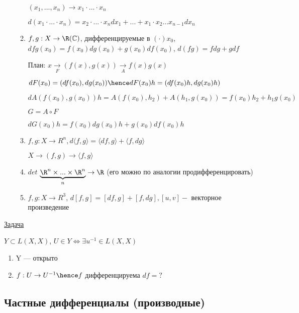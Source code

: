 \begin{examples}
\begin{enumerate}
\begin{enumerate}
        $(x_1, ..., x_n) \to x_1 \cdot \ldots \cdot x_n$

        $d(x_1 \cdot...\cdot x_n) = x_2 \cdot ... \cdot x_n dx_1 + ... + x_1 \cdot x_2 ... x_{n - 1} dx_n$

        \item $f, g : X \to \R (\mathbb{C})$, дифференцируемые в $(\cdot)x_0$, $dfg(x_0) = f(x_0)dg(x_0) + g(x_0) df(x_0)$, $d(fg) = fdg + gdf$
        
        План: $x \underset{F}{\to} (f(x), g(x)) \underset{A}{\to} f(x) g(x)$

        $dF(x_0) = (df(x_0), dg(x_0)) \hence dF(x_0)h = (df(x_0)h, dg(x_0)h)$

        $dA(f(x_0), g(x_0))h = A(f(x_0), h_2) + A(h_1, g(x_0)) = f(x_0)h_2 + h_1g(x_0)$

        $G = A \circ F$

        $dG(x_0)h = f(x_0)dg(x_0)h + g(x_0)df(x_0)h$

        \item $f, g : X \to R^n, d \langle f, g \rangle = \langle df, g \rangle + \langle f, dg \rangle$
    
        $X \to (f, g) \to \langle f, g \rangle$

        \item $det$ $\underbrace{\R ^ n \times ... \times \R^n}_{n} \to \R$ (его можно по аналогии продифференцировать)
        
        \item $f, g : X \to R^3$, $d[f, g] = [df, g] + [f, dg], 
        [u, v] - $ векторное произведение
        
    \end{enumerate}
\end{enumerate}

\underline{Задача} 

$Y \subset L(X, X)$, $U \in Y \Longleftrightarrow \exists u^{-1} \in L(X, X)$

\begin{enumerate}
    \item Y --- открыто
    \item $f : U \to U^{-1} \hence f$ дифференцируема $df = ?$
\end{enumerate}
    

\end{examples}

\newpage

\subsection{Частные дифференциалы (производные)}

